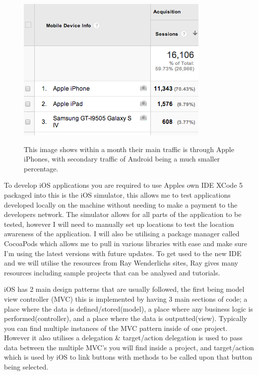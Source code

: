 	\begin{figure}[H] %
		\caption[Image of Google Analytics for popular events site]{This image shows within a month their main traffic is through Apple iPhones, with secondary traffic of Android being a much smaller percentage. }
		\centering
		\includegraphics[scale=1]{Images/google-analytics}
		\label{fig:googleAnalyticsRainbow}
	\end{figure}

	To develop iOS applications you are required to use Apples own IDE XCode 5 packaged into this is the iOS simulator, this allows me to test applications developed locally on the machine without needing to make a payment to the developers network. The simulator allows for all parts of the application to be tested, however I will need to manually set up locations to test the location awareness of the application. I will also be utilising a package manager called CocoaPods \cite{cocoapods} which allows me to pull in various libraries with ease and make sure I'm using the latest versions with future updates. To get used to the new IDE and we will utilise the resources from Ray Wenderlichs sites\cite{raywender}, Ray gives many resources including sample projects that can be analysed and tutorials.  

	iOS has 2 main design patterns that are usually followed, the first being model view controller (MVC) this is implemented by having 3 main sections of code; a place where the data is defined/stored(model), a place where any business logic is performed(controller), and a place where the data is outputted(view). Typically you can find multiple instances of the MVC pattern inside of one project. However it also utilises a delegation \& target/action delegation is used to pass data between the multiple MVC's you will find inside a project, and target/action which is used by iOS to link buttons with methods to be called upon that button being selected.


